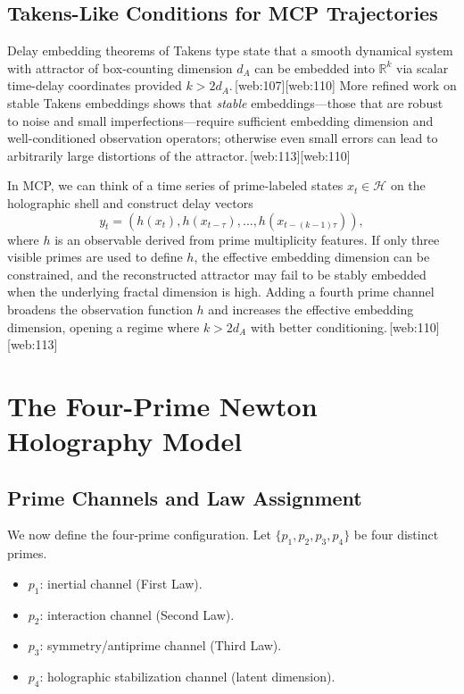 \documentclass[11pt]{article}
\begin{document}
\subsection{Takens-Like Conditions for MCP Trajectories}

Delay embedding theorems of Takens type state that a smooth dynamical system
with attractor of box-counting dimension $d_A$ can be embedded into
$\mathbb{R}^k$ via scalar time-delay coordinates provided
$k>2d_A$.\,[web:107][web:110]
More refined work on stable Takens embeddings shows that
\emph{stable} embeddings---those that are robust to noise and small
imperfections---require sufficient embedding dimension and well-conditioned
observation operators; otherwise even small errors can lead to arbitrarily
large distortions of the attractor.\,[web:113][web:110]

In MCP, we can think of a time series of prime-labeled states
$x_t\in\mathcal{H}$ on the holographic shell and construct delay vectors
\[
  y_t = (h(x_t), h(x_{t-\tau}), \dots, h(x_{t-(k-1)\tau})),
\]
where $h$ is an observable derived from prime multiplicity features.
If only three visible primes are used to define $h$, the effective embedding
dimension can be constrained, and the reconstructed attractor may fail to be
stably embedded when the underlying fractal dimension is high.
Adding a fourth prime channel broadens the observation function $h$ and
increases the effective embedding dimension, opening a regime where $k>2d_A$
with better conditioning.\,[web:110][web:113]

\section{The Four-Prime Newton Holography Model}

\subsection{Prime Channels and Law Assignment}

We now define the four-prime configuration.
Let $\{p_1,p_2,p_3,p_4\}$ be four distinct primes.

\begin{itemize}[leftmargin=*]
  \item $p_1$: inertial channel (First Law).
  \item $p_2$: interaction channel (Second Law).
  \item $p_3$: symmetry/antiprime channel (Third Law).
  \item $p_4$: holographic stabilization channel (latent dimension).
\end{itemize}
\end{document}
